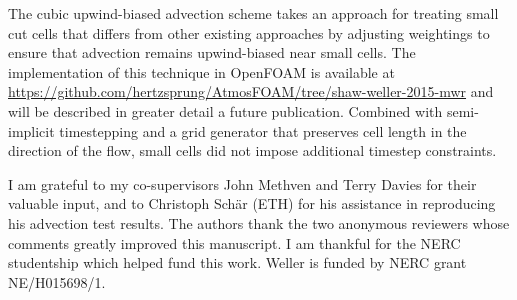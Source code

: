 \documentclass{ametsoc}
\begin{document}
The cubic upwind-biased advection scheme takes an approach for treating small cut cells that differs from other existing approaches by adjusting weightings to ensure that advection remains upwind-biased near small cells.  The implementation of this technique in OpenFOAM is available at \url{https://github.com/hertzsprung/AtmosFOAM/tree/shaw-weller-2015-mwr} and will be described in greater detail a future publication.  Combined with semi-implicit timestepping and a grid generator that preserves cell length in the direction of the flow, small cells did not impose additional timestep constraints.

\acknowledgments
I am grateful to my co-supervisors John Methven and Terry Davies for their valuable input, and to Christoph Sch\"{a}r (ETH) for his assistance in reproducing his advection test results.  The authors thank the two anonymous reviewers whose comments greatly improved this manuscript.  I am thankful for the NERC studentship which helped fund this work.  Weller is funded by NERC grant NE/H015698/1.

\begin{appendices}

\end{appendices}






\end{document}
